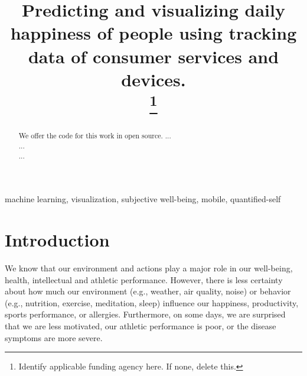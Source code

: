 \documentclass[conference]{IEEEtran}
\begin{document}
\title{Predicting and visualizing daily happiness of people using tracking data of consumer services and devices.\\
\thanks{Identify applicable funding agency here. If none, delete this.}
}

\author{


\and


\and


}

\maketitle

\begin{abstract}
We offer the code for this work in open source.
\color{red}
...\\
...\\
...
\color{black}

\end{abstract}

\begin{IEEEkeywords}
machine learning, visualization, subjective well-being, mobile, quantified-self
\end{IEEEkeywords}

\section{Introduction}
We know that our environment and actions play a major role in our well-being, health, intellectual and athletic performance.
However, there is less certainty about how much our environment (e.g., weather, air quality, noise) or behavior (e.g., nutrition, exercise, meditation, sleep) influence our happiness, productivity, sports performance, or allergies.
Furthermore, on some days, we are surprised that we are less motivated, our athletic performance is poor, or the disease symptoms are more severe.
\end{document}
